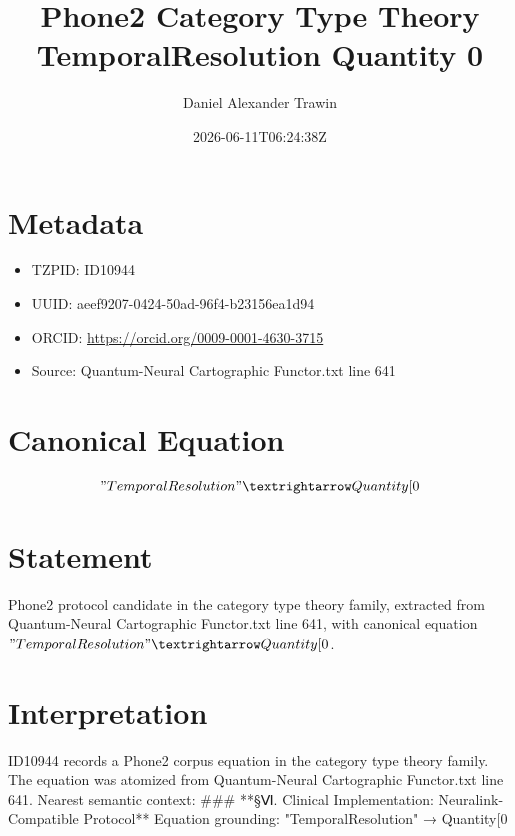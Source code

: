 \documentclass[11pt]{article}
\title{Phone2 Category Type Theory TemporalResolution Quantity 0}
\author{Daniel Alexander Trawin}
\date{2026-06-11T06:24:38Z}
\begin{document}
\maketitle
\section*{Metadata}
\begin{itemize}
\item TZPID: ID10944
\item UUID: aeef9207-0424-50ad-96f4-b23156ea1d94
\item ORCID: \url{https://orcid.org/0009-0001-4630-3715}
\item Source: Quantum-Neural Cartographic Functor.txt line 641
\end{itemize}
\section*{Canonical Equation}
\[
"TemporalResolution" → Quantity[0
\]
\section*{Statement}
Phone2 protocol candidate in the category type theory family, extracted from Quantum-Neural Cartographic Functor.txt line 641, with canonical equation $"TemporalResolution" → Quantity[0$.
\section*{Interpretation}
ID10944 records a Phone2 corpus equation in the category type theory family. The equation was atomized from Quantum-Neural Cartographic Functor.txt line 641. Nearest semantic context: ### **§Ⅵ. Clinical Implementation: Neuralink-Compatible Protocol** Equation grounding: "TemporalResolution" → Quantity[0
\end{document}
